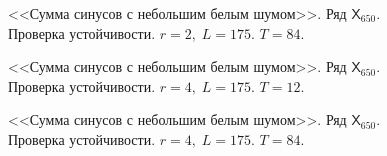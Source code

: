 \documentclass[specialist,
               substylefile = spbu.rtx,
               subf,href,colorlinks=true, 12p]{disser}
\begin{document}
\begin{figure}[h]
	\captionsetup{justification=centering}
	\caption{<<Сумма синусов с небольшим белым шумом>>. Ряд $\mathsf{X}_{650}$. Проверка устойчивости. $r = 2, \; L = 175$. $T = 84$.}
	\label{edsine0.3r2.84}
\end{figure}

\begin{figure}[h]
	\captionsetup{justification=centering}
	\caption{<<Сумма синусов с небольшим белым шумом>>. Ряд $\mathsf{X}_{650}$. Проверка устойчивости. $r = 4, \; L = 175$. $T = 12$.}
\end{figure}

\begin{figure}[h]
	\captionsetup{justification=centering}
	\caption{<<Сумма синусов с небольшим белым шумом>>. Ряд $\mathsf{X}_{650}$. Проверка устойчивости. $r = 4, \; L = 175$. $T = 84$.}
\end{figure}
\end{document}
